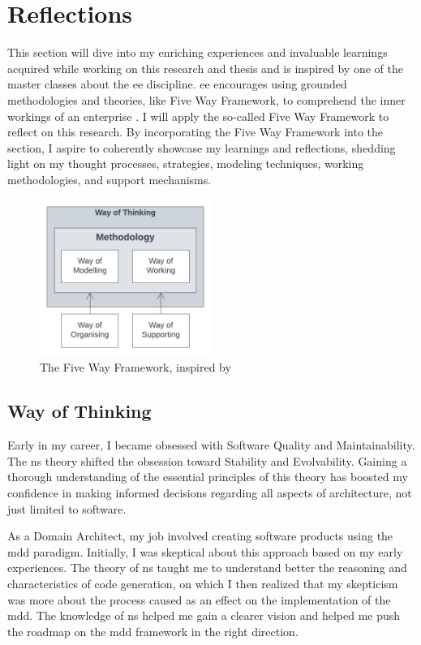 \section{Reflections} \label{chap_reflection}

This section will dive into my enriching experiences and invaluable learnings acquired
while working on this research and thesis and is inspired by one of the master classes
about the \gls{ee} discipline. \gls{ee} encourages using grounded methodologies and
theories, like Five Way Framework, to comprehend the inner workings of an enterprise
\parencite{dietz_enterprise_2020}. I will apply the so-called Five Way Framework to
reflect on this research. By incorporating the Five Way Framework into the section, I
aspire to coherently showcase my learnings and reflections, shedding light on my thought
processes, strategies, modeling techniques, working methodologies, and support mechanisms.

\begin{figure}[H]
    \centering
    \includegraphics[width=0.5\textwidth]{figures/5ways.pdf}
    \caption[The Five Way Framework]{The Five Way Framework, inspired by \textcite{dietz_enterprise_2020}}
    \label{fig_5ways}
\end{figure}

\subsection{Way of Thinking}

Early in my career, I became obsessed with Software Quality and Maintainability. The
\gls{ns} theory shifted the obsession toward Stability and Evolvability. Gaining a
thorough understanding of the essential principles of this theory has boosted my
confidence in making informed decisions regarding all aspects of architecture, not just
limited to software.

As a Domain Architect, my job involved creating software products using the \gls{mdd}
paradigm. Initially, I was skeptical about this approach based on my early experiences.
The theory of \gls{ns} taught me to understand better the reasoning and characteristics of
code generation, on which I then realized that my skepticism was more about the process
caused as an effect on the implementation of the \gls{mdd}. The knowledge of \gls{ns}
helped me gain a clearer vision and helped me push the roadmap on the \gls{mdd} framework
in the right direction.

